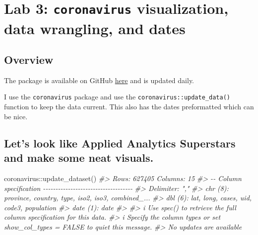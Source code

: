 \documentclass[
]{book}
\newenvironment{Shaded}{\begin{snugshade}}{\end{snugshade}}
\newcommand{\CommentTok}[1]{\textcolor[rgb]{0.56,0.35,0.01}{\textit{#1}}}
\newcommand{\FunctionTok}[1]{\textcolor[rgb]{0.00,0.00,0.00}{#1}}
\newcommand{\NormalTok}[1]{#1}
\newcommand{\SpecialCharTok}[1]{\textcolor[rgb]{0.00,0.00,0.00}{#1}}
\begin{document}
\hypertarget{lab-3-coronavirus-visualization-data-wrangling-and-dates}{%
\chapter{\texorpdfstring{Lab 3: \texttt{coronavirus} visualization, data wrangling, and dates}{Lab 3: coronavirus visualization, data wrangling, and dates}}\label{lab-3-coronavirus-visualization-data-wrangling-and-dates}}

\hypertarget{overview}{%
\section{Overview}\label{overview}}

The package is available on GitHub \href{https://github.com/RamiKrispin/coronavirus}{here} and is updated daily.

I use the \texttt{coronavirus} package and use the \texttt{coronavirus::update\_data()} function to keep the data current. This also has the dates preformatted which can be nice.

\hypertarget{lets-look-like-applied-analytics-superstars-and-make-some-neat-visuals.}{%
\section{Let's look like Applied Analytics Superstars and make some neat visuals.}\label{lets-look-like-applied-analytics-superstars-and-make-some-neat-visuals.}}

\begin{Shaded}
\begin{Highlighting}[]
\NormalTok{coronavirus}\SpecialCharTok{::}\FunctionTok{update\_dataset}\NormalTok{()}
\CommentTok{\#\textgreater{} Rows: 627405 Columns: 15}
\CommentTok{\#\textgreater{} {-}{-} Column specification {-}{-}{-}{-}{-}{-}{-}{-}{-}{-}{-}{-}{-}{-}{-}{-}{-}{-}{-}{-}{-}{-}{-}{-}{-}{-}{-}{-}{-}{-}{-}{-}{-}{-}{-}{-}}
\CommentTok{\#\textgreater{} Delimiter: ","}
\CommentTok{\#\textgreater{} chr  (8): province, country, type, iso2, iso3, combined\_...}
\CommentTok{\#\textgreater{} dbl  (6): lat, long, cases, uid, code3, population}
\CommentTok{\#\textgreater{} date (1): date}
\CommentTok{\#\textgreater{} }
\CommentTok{\#\textgreater{} i Use \textasciigrave{}spec()\textasciigrave{} to retrieve the full column specification for this data.}
\CommentTok{\#\textgreater{} i Specify the column types or set \textasciigrave{}show\_col\_types = FALSE\textasciigrave{} to quiet this message.}
\CommentTok{\#\textgreater{} No updates are available}
\end{Highlighting}
\end{Shaded}
\end{document}
